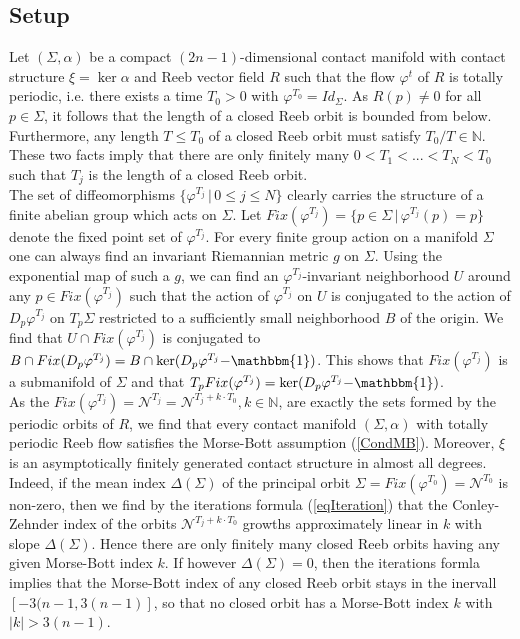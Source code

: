\documentclass[a4paper,12pt,bibliography=totocnumbered,titlepage=false,abstracton,bookmarksnumbered=true]{scrartcl}
\theoremstyle{definition}
\begin{document}
\subsection{Setup}
Let $(\Sigma,\alpha)$ be a compact $(2n{-}1)$-dimensional contact manifold with contact structure $\xi=\ker \alpha$ and Reeb vector field $R$ such that the flow $\varphi^t$ of $R$ is totally periodic, i.e. there exists a time $T_0>0$ with $\varphi^{T_0}=Id_{\Sigma}$. As $R(p)\neq 0$ for all $p\in\Sigma$, it follows that the length of a closed Reeb orbit is bounded from below. Furthermore, any length $T\leq T_0$ of a closed Reeb orbit must satisfy $T_0/T \in\mathbb{N}$. These two facts imply that there are only finitely many $0<T_1<...<T_N<T_0$ such that $T_j$ is the length of a closed Reeb orbit.\\
The set of diffeomorphisms $\{\varphi^{T_j}\,|\,0\leq j\leq N\}$ clearly carries the structure of a finite abelian group which acts on $\Sigma$. Let $Fix(\varphi^{T_j})=\{p{\in}\Sigma\,|\,\varphi^{T_j}(p){=}p\}$ denote the fixed point set of $\varphi^{T_j}$. For every finite group action on a manifold $\Sigma$ one can always find an invariant Riemannian metric $g$ on $\Sigma$. Using the exponential map of such a $g$, we can find an $\varphi^{T_j}$-invariant neighborhood $U$ around any $p\in Fix(\varphi^{T_j})$ such that the action of $\varphi^{T_j}$ on $U$ is conjugated to the action of $D_p\varphi^{T_j}$ on $T_p\Sigma$ restricted to a sufficiently small neighborhood $B$ of the origin. We find that $U\cap Fix(\varphi^{T_j})$ is conjugated to $B\cap Fix(D_p\varphi^{T_j})=B\cap \ker (D_p\varphi^{T_j}{-}\mathbbm{1})$. This shows that $Fix(\varphi^{T_j})$ is a submanifold of $\Sigma$ and that $T_pFix(\varphi^{T_j})=\ker (D_p\varphi^{T_j}{-}\mathbbm{1})$.\\
As the $Fix(\varphi^{T_j})=\mathcal{N}^{T_j}=\mathcal{N}^{T_j+k\cdot T_0}, k\in\mathbb{N}$, are exactly the sets formed by the periodic orbits of $R$, we find that every contact manifold $(\Sigma,\alpha)$ with totally periodic Reeb flow satisfies the Morse-Bott assumption (\ref{CondMB}). Moreover, $\xi$ is an asymptotically finitely generated contact structure in almost all degrees. Indeed, if the mean index $\Delta(\Sigma)$ of the principal orbit $\Sigma=Fix(\varphi^{T_0})=\mathcal{N}^{T_0}$ is non-zero, then we find by the iterations formula (\ref{eqIteration}) that the Conley-Zehnder index of the orbits $\mathcal{N}^{T_j+k\cdot T_0}$ growths approximately linear in $k$ with slope $\Delta(\Sigma)$. Hence there are only finitely many closed Reeb orbits having any given Morse-Bott index $k$. If however $\Delta(\Sigma)=0$, then the iterations formla implies that the Morse-Bott index of any closed Reeb orbit stays in the inervall $[-3(n{-}1,3(n{-}1)]$, so that no closed orbit has a Morse-Bott index $k$ with $|k|>3(n{-}1)$.
\end{document}
